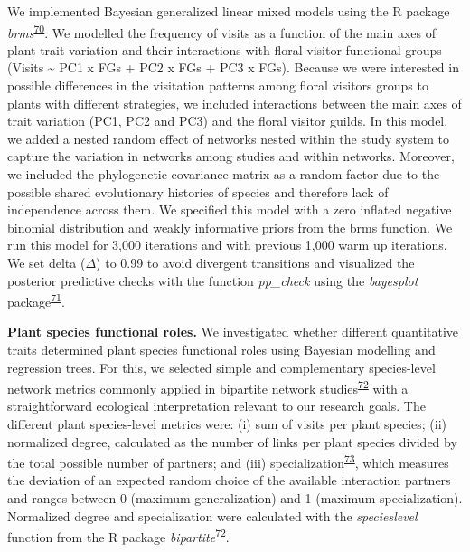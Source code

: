\documentclass[12pt,a4paper,]{article}
\begin{document}
We implemented Bayesian generalized linear mixed models using the R
package
\emph{brms}\textsuperscript{\protect\hyperlink{ref-burkner2017}{70}}. We
modelled the frequency of visits as a function of the main axes of plant
trait variation and their interactions with floral visitor functional
groups (Visits \textasciitilde{} PC1 x FGs + PC2 x FGs + PC3 x FGs).
Because we were interested in possible differences in the visitation
patterns among floral visitors groups to plants with different
strategies, we included interactions between the main axes of trait
variation (PC1, PC2 and PC3) and the floral visitor guilds. In this
model, we added a nested random effect of networks nested within the
study system to capture the variation in networks among studies and
within networks. Moreover, we included the phylogenetic covariance
matrix as a random factor due to the possible shared evolutionary
histories of species and therefore lack of independence across them. We
specified this model with a zero inflated negative binomial distribution
and weakly informative priors from the brms function. We run this model
for 3,000 iterations and with previous 1,000 warm up iterations. We set
delta (\(\Delta\)) to 0.99 to avoid divergent transitions and visualized
the posterior predictive checks with the function \emph{pp\_check} using
the \emph{bayesplot}
package\textsuperscript{\protect\hyperlink{ref-gabry2019}{71}}.

\textbf{Plant species functional roles.} We investigated whether
different quantitative traits determined plant species functional roles
using Bayesian modelling and regression trees. For this, we selected
simple and complementary species-level network metrics commonly applied
in bipartite network
studies\textsuperscript{\protect\hyperlink{ref-dormann2008}{72}} with a
straightforward ecological interpretation relevant to our research
goals. The different plant species-level metrics were: (i) sum of visits
per plant species; (ii) normalized degree, calculated as the number of
links per plant species divided by the total possible number of
partners; and (iii)
specialization\textsuperscript{\protect\hyperlink{ref-bluthgen2006}{73}},
which measures the deviation of an expected random choice of the
available interaction partners and ranges between 0 (maximum
generalization) and 1 (maximum specialization). Normalized degree and
specialization were calculated with the \emph{specieslevel} function
from the R package
\emph{bipartite}\textsuperscript{\protect\hyperlink{ref-dormann2008}{72}}.
\end{document}
